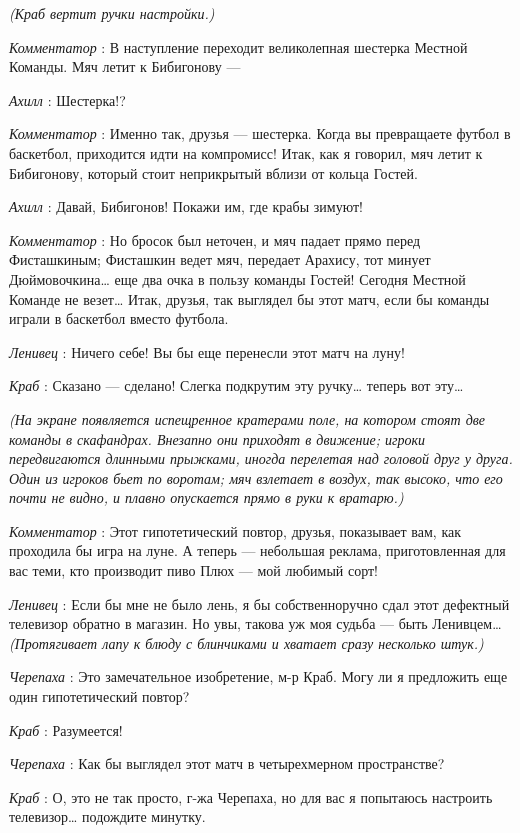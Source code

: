 \emph{(Краб вертит ручки настройки.)}

\emph{Комментатор} : В наступление переходит великолепная шестерка Местной Команды. Мяч летит к Бибигонову ---

\emph{Ахилл} : Шестерка!?

\emph{Комментатор} : Именно так, друзья --- шестерка. Когда вы превращаете футбол в баскетбол, приходится идти на компромисс! Итак, как я говорил, мяч летит к Бибигонову, который стоит неприкрытый вблизи от кольца Гостей.

\emph{Ахилл} : Давай, Бибигонов! Покажи им, где крабы зимуют!

\emph{Комментатор} : Но бросок был неточен, и мяч падает прямо перед Фисташкиным; Фисташкин ведет мяч, передает Арахису, тот минует Дюймовочкина\ldots{} еще два очка в пользу команды Гостей! Сегодня Местной Команде не везет\ldots{} Итак, друзья, так выглядел бы этот матч, если бы команды играли в баскетбол вместо футбола.

\emph{Ленивец} : Ничего себе! Вы бы еще перенесли этот матч на луну!

\emph{Краб} : Сказано --- сделано! Слегка подкрутим эту ручку\ldots{} теперь вот эту\ldots{}

\emph{(На экране появляется испещренное кратерами поле, на котором стоят две команды в скафандрах. Внезапно они приходят в движение; игроки передвигаются длинными прыжками, иногда перелетая над головой друг у друга. Один из игроков бьет по воротам; мяч взлетает в воздух, так высоко, что его почти не видно, и плавно опускается прямо в руки к вратарю.)}

\emph{Комментатор} : Этот гипотетический повтор, друзья, показывает вам, как проходила бы игра на луне. А теперь --- небольшая реклама, приготовленная для вас теми, кто производит пиво Плюх --- мой любимый сорт!

\emph{Ленивец} : Если бы мне не было лень, я бы собственноручно сдал этот дефектный телевизор обратно в магазин. Но увы, такова уж моя судьба --- быть Ленивцем\ldots{} \emph{(Протягивает лапу к блюду с блинчиками и хватает сразу несколько штук.)}

\emph{Черепаха} : Это замечательное изобретение, м-р Краб. Могу ли я предложить еще один гипотетический повтор?

\emph{Краб} : Разумеется!

\emph{Черепаха} : Как бы выглядел этот матч в четырехмерном пространстве?

\emph{Краб} : О, это не так просто, г-жа Черепаха, но для вас я попытаюсь настроить телевизор\ldots{} подождите минутку.

